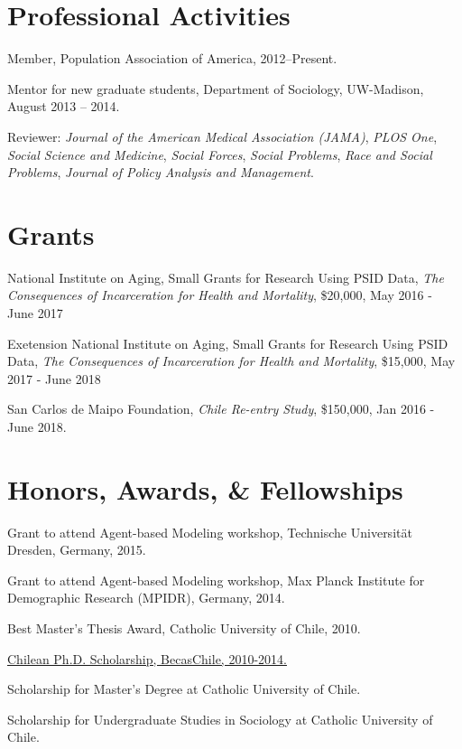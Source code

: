 \documentclass[10pt,letterpaper]{article}
\renewenvironment{itemize}{
  \begin{list}{}{
    \setlength{\leftmargin}{1.5em}
    \setlength{\itemsep}{0.25em}
    \setlength{\parskip}{0pt}
    \setlength{\parsep}{0.25em}
  }
}{
  \end{list}
}
\begin{document}
\section*{Professional Activities}

\begin{itemize}
\item Member, Population Association of America, 2012--Present.
\item Mentor for new graduate students, Department of Sociology, UW-Madison,
August 2013 – 2014.
\item Reviewer: \textit{Journal of the American Medical Association (JAMA)}, \textit{PLOS One}, \textit{Social Science and Medicine}, \textit{Social Forces}, \textit{Social Problems}, \textit{Race and Social Problems}, \textit{Journal of Policy Analysis and Management}.
\end{itemize}

\section*{Grants}

\begin{itemize}
\item National Institute on Aging, Small Grants for Research Using PSID Data, \textit{The Consequences of Incarceration for Health and Mortality},  \$20,000, May 2016 - June 2017
\item Exetension National Institute on Aging, Small Grants for Research Using PSID Data, \textit{The Consequences of Incarceration for Health and Mortality},  \$15,000, May 2017 - June 2018
\item San Carlos de Maipo Foundation, \textit{Chile Re-entry Study}, \$150,000, Jan 2016 - June 2018.
\end{itemize}


\section*{Honors, Awards, \& Fellowships}

\begin{itemize}
\item Grant to attend Agent-based Modeling workshop, Technische Universität Dresden, Germany, 2015.
\item Grant to attend Agent-based Modeling workshop, Max Planck Institute for Demographic Research (MPIDR), Germany, 2014.
\item Best Master's Thesis Award, Catholic University of Chile, 2010.
\item \href{http://www.becaschile.cl}{Chilean Ph.D. Scholarship, BecasChile, 2010-2014.}
\item Scholarship for Master’s Degree at Catholic University of Chile.
\item Scholarship for Undergraduate Studies in Sociology at Catholic University of Chile.
\end{itemize}
\end{document}
